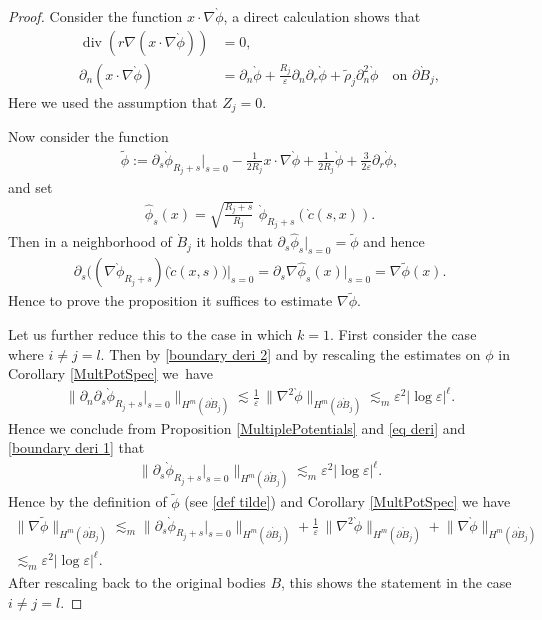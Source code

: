 \documentclass[10pt]{amsart}
\let\epsilon\varepsilon
\theoremstyle{definition}
\renewcommand{\div}{\operatorname{div}}
\newcommand\bnorm[1]{\bigl\lVert #1\bigr\rVert}
\newcommand\eq{=}
\let\de\partial
\let\eps\epsilon
\begin{document}
\begin{proof}
Consider the function $x\cdot\nabla\grave{\phi}$, a direct calculation shows that
\begin{equation}\begin{aligned}
\div(r\nabla(x\cdot\nabla\grave{\phi}))&\eq0,\label{n eq}\\
\de_n(x\cdot\nabla\grave{\phi})&\eq\de_n\grave{\phi}+\frac{R_j}{\eps}\de_n\de_r\grave{\phi}+\tilde{\rho}_j\de_n^2\grave{\phi} \quad\text{on $\de\grave{B}_j$},
\end{aligned}\end{equation}
Here we used the assumption that $Z_j=0$.

Now consider the function
\begin{align}\label{def tilde}
\tilde{\phi}:=\de_{s}\grave{\phi}_{R_j+s}\big|_{s=0}-\frac{1}{2R_j}x\cdot\nabla\grave{\phi}+\frac{1}{2R_j}\grave{\phi}+\frac{3}{2\eps}\de_r\grave{\phi},
\end{align}
and set
\begin{align*}
\hat{\phi}_s(x)\eq\sqrt{\frac{R_j+s}{R_j}}\,\,\grave{\phi}_{R_j+s}(\grave{c}(s,x)).
\end{align*}
Then in a neighborhood of $\grave{B}_j$ it holds that $\de_s\hat{\phi}_s|_{s=0}=\tilde{\phi}$ and hence
\begin{align}
\de_s\bigl((\nabla\grave{\phi}_{R_j+s})(\grave{c}(x,s)\bigr)\big|_{s=0}\eq \de_s\nabla\hat{\phi}_s(x)\big|_{s=0} \eq\nabla\tilde{\phi}(x).\label{rewritting phi}
\end{align}
Hence to prove the proposition it suffices to estimate $\nabla\tilde{\phi}$.

Let us further reduce this to the case in which $k=1$. First consider the case where $i\neq j=l$. Then by \eqref{boundary deri 2} and by rescaling the estimates on $\phi$ in Corollary \ref{MultPotSpec} we~have
\begin{align*}
\bnorm{\de_n\de_s\grave{\phi}_{R_j+s}\big|_{s=0}}_{H^m(\de\grave{B}_j)}\lesssim \frac{1}{\eps}\,\bnorm{\nabla^2\grave{\phi}}_{H^{m}(\de\grave{B}_j)}\lesssim_m\eps^{2}|{\log\eps}|^\ell.
\end{align*}
Hence we conclude from Proposition \ref{MultiplePotentials} and \eqref{eq deri} and \eqref{boundary deri 1} that
\begin{align*}
\bnorm{\de_s\grave{\phi}_{R_j+s}\big|_{s=0}}_{H^m(\de\grave{B}_j)}\lesssim_m \eps^{2}|{\log\eps}|^\ell.
\end{align*}
Hence by the definition of $\tilde{\phi}$ (see \eqref{def tilde}) and Corollary \ref{MultPotSpec} we have
\begin{multline*}
\bnorm{\nabla\tilde{\phi}}_{H^m(\de\grave{B}_j)}\lesssim_m \bnorm{\de_s\grave{\phi}_{R_j+s}\big|_{s=0}}_{H^m(\de\grave{B}_j)}+\frac{1}{\eps}\,\bnorm{\nabla^2\grave{\phi}}_{H^m(\de\grave{B}_j)}+\bnorm{\nabla\grave{\phi}}_{H^m(\de\grave{B}_j)}\\
\lesssim_m\eps^{2}|{\log\eps}|^\ell.
\end{multline*}
After rescaling back to the original bodies $B$, this shows the statement in the case $i\neq j=l$.


\end{proof}
\end{document}
